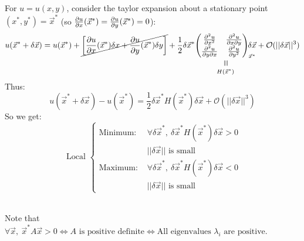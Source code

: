 \documentclass[10pt]{scrartcl}
\newcommand{\vertequiv}{\rotatebox{90}{$\,\equiv$}}
\newcommand{\equivto}[2]{\underset{\scriptstyle\overset{\mkern4mu\vertequiv}{#2}}{#1}}
\begin{document}
For $u = u(x,y)$, consider the taylor expansion about a stationary point $(x^*,y^*) = \vec{x}^*$  (so $\frac{\partial u}{\partial x}(\vec{x}^*) = \frac{\partial u}{\partial y}(\vec{x}^*) = 0$):
\[u(\vec{x}^* + \delta \vec{x}) = u(\vec{x}^*) + \cancel{\left[\frac{\del u}{\del x}(\vec{x}^*)\delta x + \frac{\del u}{\del y}(\vec{x}^*)\delta y \right]} 
+ \frac{1}{2} \delta\vec{x}^* \equivto{\begin{pmatrix}
 \frac{\del^2u}{\del x^2} & \frac{\del^2u}{\del x\del y}\\
 \frac{\del^2u}{\del y \del x} &\frac{\del^2u}{\del y^2}	
 \end{pmatrix}_{\vec{x}^*}}{H(\vec{x}^*)}\hspace*{-10pt}\delta \vec{x} + \mathcal{O}(||\delta \vec{x}||^3)
\]
Thus:
\[u(\vec{x}^* + \delta\vec{x}) - u(\vec{x}^*) = \frac{1}{2}\delta \vec{x}^* H(\vec{x}^*) \delta \vec{x} + \mathcal{O}(||\delta \vec{x}||^3)\]
So we get:
\[
\text{ Local }
\begin{cases}
\text{Minimum: } &\forall \delta\vec{x}^*,~\delta \vec{x}^* H(\vec{x}^*) \delta \vec{x} > 0 \\
& ||\delta\vec{x}|| \text{ is small }\\

\text{Maximum: } &\forall \delta\vec{x}^*,~\delta \vec{x}^* H(\vec{x}^*) \delta \vec{x} < 0 \\
& ||\delta\vec{x}|| \text{ is small }

\end{cases}\]~

Note that $\forall \vec{x},~ \vec{x}^*A\vec{x} > 0 \iff A \text{ is positive definite} \iff \text{All eigenvalues } \lambda_i \text{ are positive.}$
\end{document}
